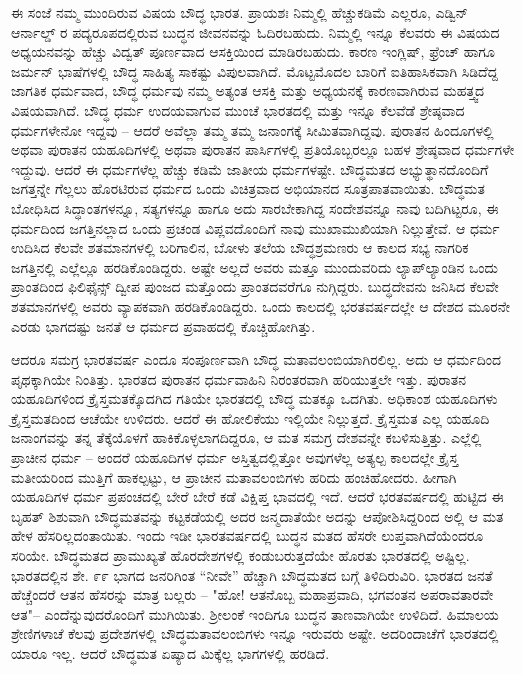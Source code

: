 ಈ ಸಂಜೆ ನಮ್ಮ ಮುಂದಿರುವ ವಿಷಯ ಬೌದ್ಧ ಭಾರತ. ಪ್ರಾಯಶಃ ನಿಮ್ಮಲ್ಲಿ ಹೆಚ್ಚುಕಡಿಮೆ ಎಲ್ಲರೂ, ಎಡ್ವಿನ್ ಆರ್ನಾಲ್ಡ್ ರ ಪದ್ಯರೂಪದಲ್ಲಿರುವ ಬುದ್ಧನ ಜೀವನವನ್ನು ಓದಿರಬಹುದು. ನಿಮ್ಮಲ್ಲಿ ಇನ್ನೂ ಕೆಲವರು ಈ ವಿಷಯದ ಅಧ್ಯಯನವನ್ನು ಹೆಚ್ಚು ವಿದ್ವತ್ ಪೂರ್ಣವಾದ ಆಸಕ್ತಿಯಿಂದ ಮಾಡಿರಬಹುದು. ಕಾರಣ ಇಂಗ್ಲಿಷ್, ಫ್ರೆಂಚ್ ಹಾಗೂ ಜರ್ಮನ್ ಭಾಷೆಗಳಲ್ಲಿ ಬೌದ್ಧ ಸಾಹಿತ್ಯ ಸಾಕಷ್ಟು ವಿಪುಲವಾಗಿದೆ. ಮೊಟ್ಟಮೊದಲ ಬಾರಿಗೆ ಐತಿಹಾಸಿಕವಾಗಿ ಸಿಡಿದೆದ್ದ ಜಾಗತಿಕ ಧರ್ಮವಾದ, ಬೌದ್ಧ ಧರ್ಮವು ನಮ್ಮ ಅತ್ಯಂತ ಆಸಕ್ತಿ ಮತ್ತು ಅಧ್ಯಯನಕ್ಕೆ ಕಾರಣವಾಗಿರುವ ಮಹತ್ತ್ವದ ವಿಷಯವಾಗಿದೆ. ಬೌದ್ಧ ಧರ್ಮ ಉದಯವಾಗುವ ಮುಂಚೆ ಭಾರತದಲ್ಲಿ ಮತ್ತು ಇನ್ನೂ ಕೆಲವೆಡೆ ಶ್ರೇಷ್ಠವಾದ ಧರ್ಮಗಳೇನೋ ಇದ್ದವು – ಆದರೆ ಅವೆಲ್ಲಾ ತಮ್ಮ ತಮ್ಮ ಜನಾಂಗಕ್ಕೆ ಸೀಮಿತವಾಗಿದ್ದವು. ಪುರಾತನ ಹಿಂದೂಗಳಲ್ಲಿ ಅಥವಾ ಪುರಾತನ ಯಹೂದಿಗಳಲ್ಲಿ ಅಥವಾ ಪುರಾತನ ಪಾರ್ಸಿಗಳಲ್ಲಿ ಪ್ರತಿಯೊಬ್ಬರಲ್ಲೂ ಬಹಳ ಶ್ರೇಷ್ಠವಾದ ಧರ್ಮಗಳೇ ಇದ್ದುವು. ಆದರೆ ಈ ಧರ್ಮಗಳೆಲ್ಲ ಹೆಚ್ಚು ಕಡಿಮೆ ಜಾತೀಯ ಧರ್ಮಗಳಷ್ಟೇ. ಬೌದ್ಧಮತದ ಅಭ್ಯುತ್ಥಾನದೊಂದಿಗೆ ಜಗತ್ತನ್ನೇ ಗೆಲ್ಲಲು ಹೊರಟಿರುವ ಧರ್ಮದ ಒಂದು ವಿಚಿತ್ರವಾದ ಅಭಿಯಾನದ ಸೂತ್ರಪಾತವಾಯಿತು. ಬೌದ್ಧಮತ ಬೋಧಿಸಿದ ಸಿದ್ಧಾಂತಗಳನ್ನೂ, ಸತ್ಯಗಳನ್ನೂ ಹಾಗೂ ಅದು ಸಾರಬೇಕಾಗಿದ್ದ ಸಂದೇಶವನ್ನೂ ನಾವು ಬದಿಗಿಟ್ಟರೂ, ಈ ಧರ್ಮದಿಂದ ಜಗತ್ತಿನಲ್ಲಾದ ಒಂದು ಪ್ರಚಂಡ ವಿಪ್ಲವದೊಂದಿಗೆ ನಾವು ಮುಖಾಮುಖಿಯಾಗಿ ನಿಲ್ಲುತ್ತೇವೆ. ಆ ಧರ್ಮ ಉದಿಸಿದ ಕೆಲವೇ ಶತಮಾನಗಳಲ್ಲಿ ಬರಿಗಾಲಿನ, ಬೋಳು ತಲೆಯ ಬೌದ್ಧಶ್ರಮಣರು ಆ ಕಾಲದ ಸಭ್ಯ ನಾಗರಿಕ ಜಗತ್ತಿನಲ್ಲಿ ಎಲ್ಲೆಲ್ಲೂ ಹರಡಿಕೊಂಡಿದ್ದರು. ಅಷ್ಟೇ ಅಲ್ಲದೆ ಅವರು ಮತ್ತೂ ಮುಂದುವರಿದು ಲ್ಯಾಪ್‌ಲ್ಯಾಂಡಿನ ಒಂದು ಪ್ರಾಂತದಿಂದ ಫಿಲಿಫೈನ್ಸ್ ದ್ವೀಪ ಪುಂಜದ ಮತ್ತೊಂದು ಪ್ರಾಂತದವರೆಗೂ ನುಗ್ಗಿದ್ದರು. ಬುದ್ಧದೇವನು ಜನಿಸಿದ ಕೆಲವೇ ಶತಮಾನಗಳಲ್ಲಿ ಅವರು ವ್ಯಾಪಕವಾಗಿ ಹರಡಿಕೊಂಡಿದ್ದರು. ಒಂದು ಕಾಲದಲ್ಲಿ ಭರತವರ್ಷದಲ್ಲೇ ಆ ದೇಶದ ಮೂರನೇ ಎರಡು ಭಾಗದಷ್ಟು ಜನತೆ ಆ ಧರ್ಮದ ಪ್ರವಾಹದಲ್ಲಿ ಕೊಚ್ಚಿಹೋಗಿತ್ತು.

ಆದರೂ ಸಮಗ್ರ ಭಾರತವರ್ಷ ಎಂದೂ ಸಂಪೂರ್ಣವಾಗಿ ಬೌದ್ಧ ಮತಾವಲಂಬಿಯಾಗಿರಲಿಲ್ಲ. ಅದು ಆ ಧರ್ಮದಿಂದ ಪೃಥಕ್ಕಾಗಿಯೇ ನಿಂತಿತ್ತು. ಭಾರತದ ಪುರಾತನ ಧರ್ಮವಾಹಿನಿ ನಿರಂತರವಾಗಿ ಹರಿಯುತ್ತಲೇ ಇತ್ತು. ಪುರಾತನ ಯಹೂದಿಗಳಿಂದ ಕ್ರೈಸ್ತಮತಕ್ಕೊದಗಿದ ಗತಿಯೇ ಭಾರತದಲ್ಲಿ ಬೌದ್ಧ ಮತಕ್ಕೂ ಒದಗಿತು. ಅಧಿಕಾಂಶ ಯಹೂದಿಗಳು ಕ್ರೈಸ್ತಮತದಿಂದ ಆಚೆಯೇ ಉಳಿದರು. ಆದರೆ ಈ ಹೋಲಿಕೆಯು ಇಲ್ಲಿಯೇ ನಿಲ್ಲುತ್ತದೆ. ಕ್ರೈಸ್ತಮತ ಎಲ್ಲ ಯಹೂದಿ ಜನಾಂಗವನ್ನು ತನ್ನ ತೆಕ್ಕೆಯೊಳಗೆ ಹಾಕಿಕೊಳ್ಳಲಾಗದಿದ್ದರೂ, ಆ ಮತ ಸಮಗ್ರ ದೇಶವನ್ನೇ ಕಬಳಿಸುತ್ತಿತ್ತು. ಎಲ್ಲೆಲ್ಲಿ ಪ್ರಾಚೀನ ಧರ್ಮ – ಅಂದರೆ ಯಹೂದಿಗಳ ಧರ್ಮ ಅಸ್ತಿತ್ವದಲ್ಲಿತ್ತೋ ಅವುಗಳೆಲ್ಲ ಅತ್ಯಲ್ಪ ಕಾಲದಲ್ಲೇ ಕ್ರೈಸ್ತ ಮತೀಯರಿಂದ ಮುತ್ತಿಗೆ ಹಾಕಲ್ಪಟ್ಟು, ಆ ಪ್ರಾಚೀನ ಮತಾವಲಂಬಿಗಳು ಹರಿದು ಹಂಚಿಹೋದರು. ಹೀಗಾಗಿ ಯಹೂದಿಗಳ ಧರ್ಮ ಪ್ರಪಂಚದಲ್ಲಿ ಬೇರೆ ಬೇರೆ ಕಡೆ ವಿಕ್ಷಿಪ್ತ ಭಾವದಲ್ಲಿ ಇದೆ. ಆದರೆ ಭರತವರ್ಷದಲ್ಲಿ ಹುಟ್ಟಿದ ಈ ಬೃಹತ್ ಶಿಶುವಾಗಿ ಬೌದ್ಧಮತವನ್ನು ಕಟ್ಟಕಡೆಯಲ್ಲಿ ಅದರ ಜನ್ಮದಾತೆಯೇ ಅದನ್ನು ಆಪೋಶಿಸಿದ್ದರಿಂದ ಅಲ್ಲಿ ಆ ಮತ ಹೇಳ ಹೆಸರಿಲ್ಲದಂತಾಯಿತು. ಇಂದು ಇಡೀ ಭಾರತವರ್ಷದಲ್ಲಿ ಬುದ್ಧನ ಮತದ ಹೆಸರೇ ಲುಪ್ತವಾಗಿದೆಯೆಂದರೂ ಸರಿಯೇ. ಬೌದ್ಧಮತದ ಪ್ರಾಮುಖ್ಯತೆ ಹೊರದೇಶಗಳಲ್ಲಿ ಕಂಡುಬರುತ್ತದೆಯೇ ಹೊರತು ಭಾರತದಲ್ಲಿ ಅಷ್ಟಿಲ್ಲ. ಭಾರತದಲ್ಲಿನ ಶೇ. ೯೯ ಭಾಗದ ಜನರಿಗಿಂತ “ನೀವೇ” ಹೆಚ್ಚಾಗಿ ಬೌದ್ಧಮತದ ಬಗ್ಗೆ ತಿಳಿದಿರುವಿರಿ. ಭಾರತದ ಜನತೆ ಹೆಚ್ಚೆಂದರೆ ಆತನ ಹೆಸರನ್ನು ಮಾತ್ರ ಬಲ್ಲರು – "ಹೋ! ಆತನೊಬ್ಬ ಮಹಾಪ್ರವಾದಿ, ಭಗವಂತನ ಅಪರಾವತಾರವೇ ಆತ"– ಎಂದೆನ್ನುವುದರೊಂದಿಗೆ ಮುಗಿಯಿತು. ಶ‍್ರೀಲಂಕೆ ಇಂದಿಗೂ ಬುದ್ಧನ ತಾಣವಾಗಿಯೇ ಉಳಿದಿದೆ. ಹಿಮಾಲಯ ಶ್ರೇಣಿಗಳಾಚೆ ಕೆಲವು ಪ್ರದೇಶಗಳಲ್ಲಿ ಬೌದ್ಧಮತಾವಲಂಬಿಗಳು ಇನ್ನೂ ಇರುವರು ಅಷ್ಟೇ. ಅದರಿಂದಾಚೆಗೆ ಭಾರತದಲ್ಲಿ ಯಾರೂ ಇಲ್ಲ. ಆದರೆ ಬೌದ್ಧಮತ ಏಷ್ಯಾದ ಮಿಕ್ಕೆಲ್ಲ ಭಾಗಗಳಲ್ಲಿ ಹರಡಿದೆ.

